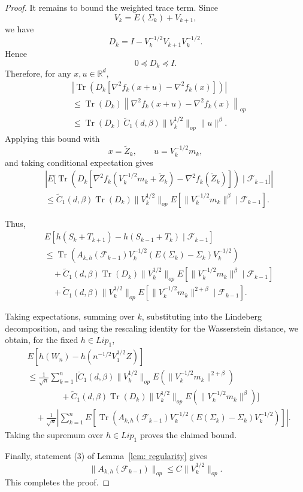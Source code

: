 \documentclass[11pt]{article}
\begin{document}
\begin{proof}
It remains to bound the weighted trace term. Since
\[
    V_k=E(\Sigma_k)+V_{k+1},
\]
we have
\[
    D_k=I-V_k^{-1/2}V_{k+1}V_k^{-1/2}.
\]
Hence
\[
    0\preceq D_k\preceq I.
\]
Therefore, for any \(x,u\in\mathbb R^d\),
\begin{align*}
&\left|
\operatorname{Tr}\left(
D_k
\left[
\nabla^2 f_k(x+u)-\nabla^2 f_k(x)
\right]
\right)
\right|
\\
&\le
\operatorname{Tr}(D_k)
\left\|
\nabla^2 f_k(x+u)-\nabla^2 f_k(x)
\right\|_{op}
\\
&\le
   \operatorname{Tr}(D_k)\,\tilde C_1(d,\beta)\|V_k^{1/2}\|_{op}\|u\|^\beta.
\end{align*}
Applying this bound with
\[
    x=\widetilde Z_k,
    \qquad
    u=V_k^{-1/2}m_k,
\]
and taking conditional expectation gives
\begin{align*}
&\left|
E\biggl[
\operatorname{Tr}\left(
D_k
\left[
\nabla^2 f_k\left(V_k^{-1/2}m_k+\widetilde Z_k\right)
-
\nabla^2 f_k(\widetilde Z_k)
\right]
\right)
\mid
\mathcal F_{k-1}
\biggr]
\right|
\\
&\le
\tilde C_1(d,\beta)\operatorname{Tr}(D_k)\|V_k^{1/2}\|_{op}
E\left[
\|V_k^{-1/2}m_k\|^\beta
\mid
\mathcal F_{k-1}
\right].
\end{align*}

Thus,
\begin{align*}
& E\left[
h(S_k+T_{k+1})-h(S_{k-1}+T_k)
\mid
\mathcal F_{k-1}
\right]
\\
&\le
\operatorname{Tr}\left(
A_{k,h}(\mathcal F_{k-1})
V_k^{-1/2}
\left(E(\Sigma_k)-\Sigma_k\right)
V_k^{-1/2}
\right)
\\
&\quad
+
\tilde C_1(d,\beta)\operatorname{Tr}(D_k)\|V_k^{1/2}\|_{op}
E\left[
\|V_k^{-1/2}m_k\|^\beta
\mid
\mathcal F_{k-1}
\right]
\\
&\quad
+
\tilde C_1(d,\beta)\|V_k^{1/2}\|_{op}
E\left[
\|V_k^{-1/2}m_k\|^{2+\beta}
\mid
\mathcal F_{k-1}
\right].
\end{align*}

Taking expectations, summing over \(k\), substituting into the Lindeberg
decomposition, and using the rescaling identity for the Wasserstein distance,
we obtain, for the fixed \(h\in Lip_1\),
\begin{align*}
& E\left[
h(W_n)-h(n^{-1/2}V_1^{1/2}Z)
\right]
\\
&\le
\frac{1}{\sqrt n}\sum_{k=1}^n
\Biggl[
\tilde C_1(d,\beta)\|V_k^{1/2}\|_{op}
E\left(\|V_k^{-1/2}m_k\|^{2+\beta}\right)
\\
&\qquad\qquad
+
\tilde C_1(d,\beta)\operatorname{Tr}(D_k)\|V_k^{1/2}\|_{op}
E\left(\|V_k^{-1/2}m_k\|^\beta\right)
\Biggr]
\\
&\quad
+
\frac{1}{\sqrt n}
\left|\sum_{k=1}^n
E\left[
\operatorname{Tr}\left(
A_{k,h}(\mathcal F_{k-1})
V_k^{-1/2}
\left(E(\Sigma_k)-\Sigma_k\right)
V_k^{-1/2}
\right)
\right]
\right|.
\end{align*}
Taking the supremum over \(h\in Lip_1\) proves the claimed bound.

Finally, statement (3) of Lemma~\ref{lem: regularity} gives
\[
    \|A_{k,h}(\mathcal F_{k-1})\|_{op}
    \le
    C\|V_k^{1/2}\|_{op}.
\]
This completes the proof.
\end{proof}
\end{document}
